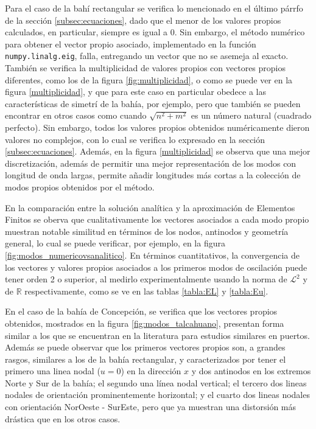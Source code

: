   Para el caso de la bah\'i rectangular se verifica lo mencionado en el \'ultimo p\'arrfo de la secci\'on \ref{subsec:ecuaciones}, dado que el menor de los valores propios calculados, en particular, siempre es igual a 0. Sin embargo, el m\'etodo num\'erico para obtener el vector propio asociado, implementado en la funci\'on \verb;numpy.linalg.eig;, falla, entregando un vector que no se asemeja al exacto. Tambi\'en se verifica la multiplicidad de valores propios con vectores propios diferentes, como los de la figura \ref{fig:multiplicidad}, o como se puede ver en la figura \ref{multiplicidad}, y que para este caso en particular obedece a las caracter\'isticas de simetr\'i de la bah\'ia, por ejemplo, pero que tambi\'en se pueden encontrar en otros casos como cuando $\sqrt{n^2+m^2}$ es un n\'umero natural (cuadrado perfecto). Sin embargo, todos los valores propios obtenidos num\'ericamente dieron valores no complejos, con lo cual se verifica lo expresado en la secci\'on \ref{subsec:ecuaciones}\cite{nica2011}. Adem\'as, en la figura \ref{multiplicidad} se observa que una mejor discretizaci\'on, adem\'as de permitir una mejor representaci\'on de los modos con longitud de onda largas, permite a\~nadir longitudes m\'as cortas a la colecci\'on de modos propios obtenidos por el m\'etodo.
  
  En la comparaci\'on entre la soluci\'on anal\'itica y la aproximaci\'on de Elementos Finitos se oberva que cualitativamente los vectores asociados a cada modo propio muestran notable similitud en t\'erminos de los nodos, antinodos y geometr\'ia general, lo cual se puede verificar, por ejemplo, en la figura \ref{fig:modos_numericovsanalitico}. En t\'erminos cuantitativos, la convergencia de los vectores y valores propios asociados a los primeros modos de oscilaci\'on puede tener orden 2 o superior, al medirlo experimentalmente usando la norma de $\mathcal{L}^2$ y de $\mathbb{R}$ respectivamente, como se ve en las  tablas \ref{tabla:EL} y \ref{tabla:Eu}.
  
  
  En el caso de la bah\'ia de Concepci\'on, se verifica que los vectores propios obtenidos, mostrados en la figura \ref{fig:modos_talcahuano}, presentan forma similar a los que se encuentran en la literatura para estudios similares en puertos. Adem\'as se puede observar que los primeros vectores propios son, a grandes rasgos, similares a los de la bah\'ia rectangular, y caracterizados por tener el primero una linea nodal ($u=0$) en la direcci\'on $x$ y dos antinodos en los extremos Norte y Sur de la bah\'ia; el segundo una l\'inea nodal vertical; el tercero dos lineas nodales de orientaci\'on prominentemente horizontal; y el cuarto dos lineas nodales con orientaci\'on NorOeste - SurEste, pero que ya muestran una distorsi\'on m\'as dr\'astica que en los otros casos. 
  
